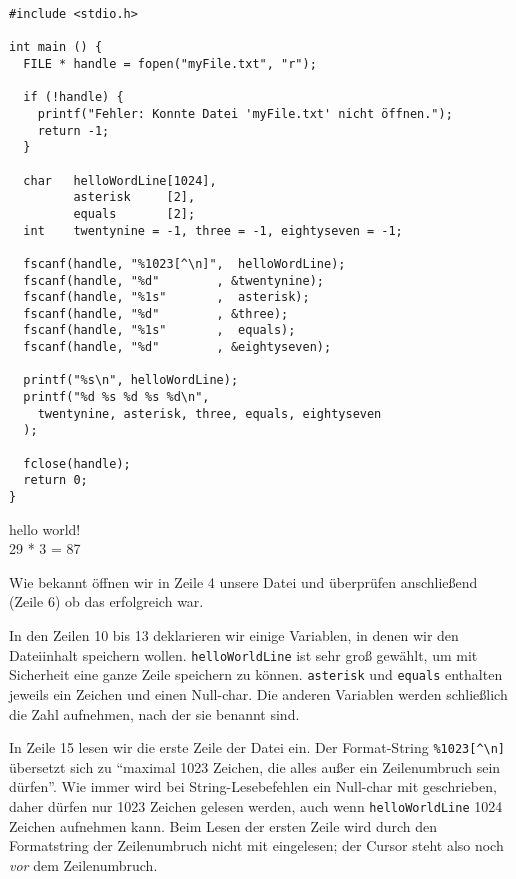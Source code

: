 \begin{codebox}
\begin{verbatim}
#include <stdio.h>

int main () {
  FILE * handle = fopen("myFile.txt", "r");

  if (!handle) {
    printf("Fehler: Konnte Datei 'myFile.txt' nicht öffnen.");
    return -1;
  }

  char   helloWordLine[1024],
         asterisk     [2],
         equals       [2];
  int    twentynine = -1, three = -1, eightyseven = -1;

  fscanf(handle, "%1023[^\n]",  helloWordLine);
  fscanf(handle, "%d"        , &twentynine);
  fscanf(handle, "%1s"       ,  asterisk);
  fscanf(handle, "%d"        , &three);
  fscanf(handle, "%1s"       ,  equals);
  fscanf(handle, "%d"        , &eightyseven);

  printf("%s\n", helloWordLine);
  printf("%d %s %d %s %d\n",
    twentynine, asterisk, three, equals, eightyseven
  );

  fclose(handle);
  return 0;
}
\end{verbatim}
\end{codebox}

\begin{cmdbox}
hello world!\\
29 * 3 = 87
\end{cmdbox}

Wie bekannt öffnen wir in Zeile 4 unsere Datei und überprüfen anschließend (Zeile 6) ob das erfolgreich war.

In den Zeilen 10 bis 13 deklarieren wir einige Variablen, in denen wir den Dateiinhalt speichern wollen. \texttt{helloWorldLine} ist sehr groß gewählt, um mit Sicherheit eine ganze Zeile speichern zu können. \texttt{asterisk} und \texttt{equals} enthalten jeweils ein Zeichen und einen Null-char. Die anderen Variablen werden schließlich die Zahl aufnehmen, nach der sie benannt sind.

In Zeile 15 lesen wir die erste Zeile der Datei ein. Der Format-String
\texttt{\%1023[\textasciicircum\textbackslash n]}
übersetzt sich zu \enquote{maximal 1023 Zeichen, die alles außer ein Zeilenumbruch sein dürfen}. Wie immer wird bei String-Lesebefehlen ein Null-char mit geschrieben, daher dürfen nur 1023 Zeichen gelesen werden, auch wenn \texttt{helloWorldLine} 1024 Zeichen aufnehmen kann. Beim Lesen der ersten Zeile wird durch den Formatstring der Zeilenumbruch nicht mit eingelesen; der Cursor steht also noch \emph{vor} dem Zeilenumbruch.

